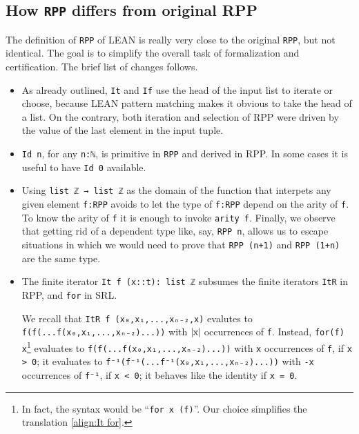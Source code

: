 \documentclass[runningheads]{llncs}
\newcommand{\RPP}{\textsf{RPP}\xspace}
\newcommand{\LEAN}{\textsf{LEAN}\xspace}
\newcommand{\SRL}{\textsf{SRL}\xspace}
\begin{document}
\subsection{How {\normalfont \lstinline|RPP|} differs from original {\normalfont \RPP}}
The definition of \lstinline|RPP| of \LEAN is really very close to the original \lstinline{RPP}, but not identical. The goal is to simplify the overall task of formalization and certification. The brief list of changes follows.
\begin{itemize}
    \item As already outlined, \lstinline|It| and \lstinline|If| use the head of the input list to iterate or choose, because \LEAN pattern matching makes it obvious to take the head of a list. On the contrary, both iteration and selection of \RPP were driven by the value of the last element in the input tuple.

    \item \lstinline|Id n|, for any \lstinline|n:ℕ|, is primitive in \lstinline|RPP| and derived in \RPP. In some cases it is useful to have \lstinline|Id 0| available.

    \item Using \lstinline|list ℤ → list ℤ| as the domain of the function that interpets any given element \lstinline|f:RPP| avoids to let the type of \lstinline|f:RPP| depend on the arity of \lstinline|f|. To know the arity of \lstinline|f| it is enough to invoke \lstinline|arity f|. Finally, we observe that getting rid of a dependent type like, say, \lstinline|RPP n|, allows us to escape situations in which we would need to prove that \lstinline{RPP (n+1)} and \lstinline{RPP (1+n)} are the same type.

    \item The finite iterator \lstinline|It f (x::t): list ℤ| subsumes the finite iterators \lstinline|ItR| in \RPP, and \lstinline|for| in \SRL.

    We recall that \lstinline|ItR f (x₀,x₁,...,xₙ₋₂,x)| evalutes to \lstinline|f(f(...f(x₀,x₁,...,xₙ₋₂)...))| with $ \mid\!\!\mbox{\lstinline|x|}\!\!\mid $ occurrences of \lstinline|f|.
    Instead, \lstinline|for(f) x|\footnote{In fact, the syntax would be ``\lstinline|for x (f)|''. Our choice simplifies the translation \eqref{align:It for}.} evaluates to \lstinline|f(f(...f(x₀,x₁,...,xₙ₋₂)...))| with \lstinline|x| occurrences of \lstinline|f|, if \lstinline|x > 0|; it evaluates to \lstinline|f⁻¹(f⁻¹(...f⁻¹(x₀,x₁,...,xₙ₋₂)...))| with \lstinline|-x| occurrences of \lstinline|f⁻¹|, if \lstinline|x < 0|; it behaves like the identity if \lstinline|x = 0|.


\end{itemize}
\end{document}
